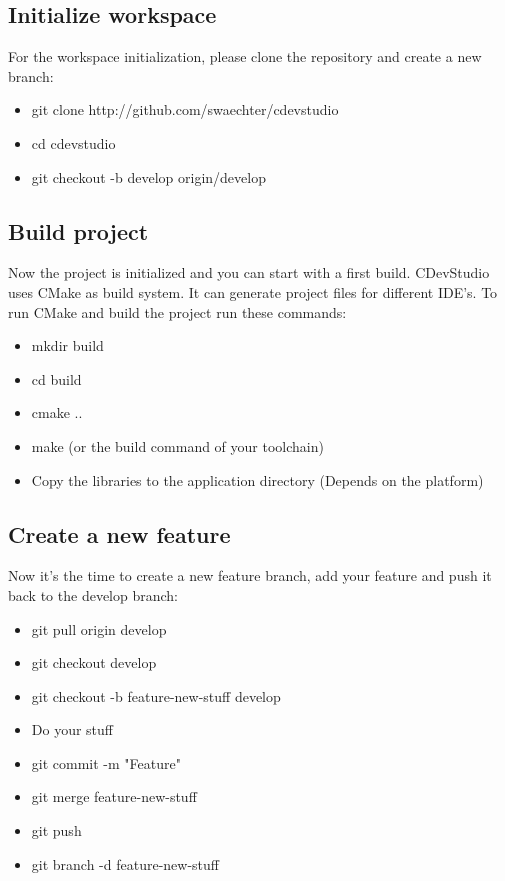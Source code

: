 \documentclass{article}
\begin{document}
\subsection{Initialize workspace}
For the workspace initialization, please clone the repository and create a new branch:

\begin{itemize}
	\item git clone http://github.com/swaechter/cdevstudio
	\item cd cdevstudio
	\item git checkout -b develop origin/develop
\end{itemize}

\subsection{Build project}
Now the project is initialized and you can start with a first build. CDevStudio uses CMake as build system. It can generate project files for different IDE's. To run CMake and build the project run these commands:

\begin{itemize}
	\item mkdir build
	\item cd build
	\item cmake ..
	\item make (or the build command of your toolchain)
	\item Copy the libraries to the application directory (Depends on the platform)
\end{itemize}

\subsection{Create a new feature}
Now it's the time to create a new feature branch, add your feature and push it back to the develop branch:

\begin{itemize}
	\item git pull origin develop
	\item git checkout develop
	\item git checkout -b feature-new-stuff develop
	\item Do your stuff
	\item git commit -m "Feature"
	\item git merge feature-new-stuff
	\item git push
	\item git branch -d feature-new-stuff
\end{itemize}
\end{document}

